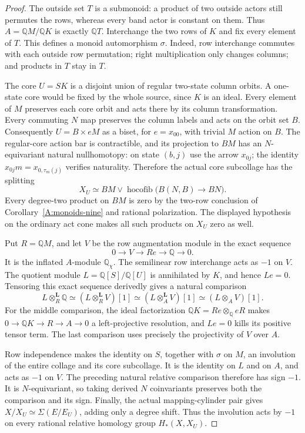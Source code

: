 \begin{proof}
The outside set $T$ is a submonoid: a product of two
outside actors still permutes the rows, whereas every
band actor is constant on them.  Thus
$A=\mathbb QM/\mathbb QK$ is exactly $\mathbb QT$.
Interchange the two rows of $K$ and fix every element of
$T$.  This defines a monoid automorphism $\sigma$.
Indeed, row interchange commutes with each outside row
permutation; right multiplication only changes columns;
and products in $T$ stay in $T$.

The core $U=SK$ is a disjoint union of regular two-state
column orbits.  A one-state core would be fixed by the
whole source, since $K$ is an ideal.  Every element of
$M$ preserves each core orbit and acts there by its
column transformation.  Every commuting $N$ map preserves
the column labels and acts on the orbit set $B$.
Consequently $U=B\times eM$ as a biset, for
$e=x_{00}$, with trivial $M$ action on $B$.
The regular-core action bar is contractible, and its
projection to $BM$ has an $N$-equivariant natural
nullhomotopy: on state $(b,j)$ use the arrow $x_{0j}$;
the identity $x_{0j}m=x_{0,\tau_m(j)}$ verifies naturality.
Therefore the actual core subcollage has the splitting
\[
 X_U\simeq BM\vee
 \operatorname{hocofib}\bigl(B(N,B)\longrightarrow BN\bigr).
\]
Every degree-two product on $BM$ is zero by the
two-row conclusion of Corollary~\ref{A:monoids-nine}
and rational polarization.  The displayed hypothesis on the ordinary
act cone makes all such products on $X_U$ zero as well.

Put $R=\mathbb QM$, and let $V$ be the row augmentation
module in the exact sequence
\[
 0\longrightarrow V\longrightarrow Re
   \longrightarrow\mathbb Q\longrightarrow0.
\]
It is the inflated $A$-module $\mathbb Q_\chi$.
The semilinear row interchange acts as $-1$ on $V$.
The quotient module $L=\mathbb Q[S]/\mathbb Q[U]$ is
annihilated by $K$, and hence $Le=0$.  Tensoring this
exact sequence derivedly gives a natural comparison
\[
 L\otimes_R^{\mathbf L}\mathbb Q
  \simeq (L\otimes_R^{\mathbf L}V)[1]
  \simeq (L\otimes_A^{\mathbf L}V)[1]
  \simeq (L\otimes_A V)[1].
\]
For the middle comparison, the ideal factorization
$\mathbb QK=Re\otimes_{\mathbb Q}eR$ makes
$0\to\mathbb QK\to R\to A\to0$ a left-projective
resolution, and $Le=0$ kills its positive tensor term.
The last comparison uses precisely the projectivity of
$V$ over $A$.

Row independence makes the identity on $S$, together
with $\sigma$ on $M$, an involution of the entire
collage and its core subcollage.  It is the identity on
$L$ and on $A$, and acts as $-1$ on $V$.
The preceding natural relative comparison therefore has
sign $-1$.  It is $N$-equivariant, so taking derived
$N$ coinvariants preserves both the comparison and its
sign.  Finally, the actual mapping-cylinder pair gives
$X/X_U\simeq\Sigma(E/E_U)$, adding only a degree shift.
Thus the involution acts by $-1$ on every rational
relative homology group $H_*(X,X_U)$.


\end{proof}
